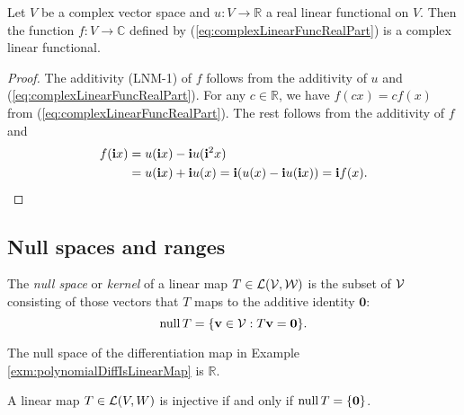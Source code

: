 \begin{lem}
  \label{lem:realLinearFuncToComplex}
  Let $V$ be a complex vector space
  and $u: V\rightarrow \mathbb{R}$
  a real linear functional on $V$.
  Then the function $f: V \rightarrow \mathbb{C}$
  defined by (\ref{eq:complexLinearFuncRealPart})
  is a complex linear functional. %
\end{lem}
\begin{proof}
  The additivity (LNM-1) of $f$ follows from
  the additivity of $u$ and (\ref{eq:complexLinearFuncRealPart}).
  For any $c\in \mathbb{R}$, we have
  $f(cx)=cf(x)$ from
  (\ref{eq:complexLinearFuncRealPart}).
  The rest follows from the additivity of $f$
  and 
  \begin{align*}
    f(\mathbf{i} x) &= u(\mathbf{i} x) - \mathbf{i} u(\mathbf{i}^2 x)
    \\
    &= u(\mathbf{i} x) + \mathbf{i} u( x)
      = \mathbf{i} (u(x) - \mathbf{i} u(\mathbf{i} x)) = \mathbf{i} f(x).
      \qedhere
  \end{align*}
\end{proof}

\subsection{Null spaces and ranges}
\label{sec:null-spaces-ranges}

\begin{defn}
  \label{def:nullSpace}
  The \emph{null space} or \emph{kernel} of a linear map
  \mbox{$T\in {\cal L}({\cal V}, {\cal W})$}
  is the subset of ${\cal V}$ consisting of those vectors
  that $T$ maps to the additive identity $\mathbf{0}$:
  \begin{equation}
    \label{eq:nullSpace}
    \mathrm{null}\,T = \{\mathbf{v}\in {\cal V} : T\mathbf{v}=\mathbf{0}\}.
  \end{equation}
\end{defn}

\begin{exm}
  The null space of the differentiation map
  in Example \ref{exm:polynomialDiffIsLinearMap} is $\mathbb{R}$.
\end{exm}


\begin{thm}
  \label{thm:injectiveIsNull0}
  A linear map $T\in {\cal L}(V,W)$ is injective
  if and only if $\mathrm{null}\,T=\{\mathbf{0}\}$.
\end{thm}

